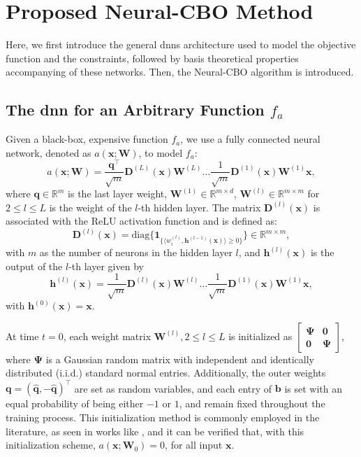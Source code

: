 \section{Proposed Neural-CBO Method}
\label{section:neural-cbo}
Here, we first introduce the general \acp{dnn} architecture used to model the objective function and the constraints, followed by basis theoretical properties accompanying of these networks. Then, the Neural-CBO algorithm is introduced. 

\subsection{The \acl{dnn} for an Arbitrary Function $f_a$}
\label{section:neural-cbo_arbitrary_nn}
Given a black-box, expensive function $f_a$, we use a fully connected neural network, denoted as $a(\mathbf{x}; \mathbf{W})$, to model $f_a$:
\begin{equation}
\label{eqn:neural-cbo_fcn}
    a(\mathbf{x}; \mathbf{W}) = \frac{\mathbf{q}^\top}{\sqrt{m}} \mathbf{D}^{(L)}(\mathbf{x}) \mathbf{W}^{(L)} \dots \frac{1}{\sqrt{m}} \mathbf{D}^{(1)}(\mathbf{x}) \mathbf{W}^{(1)} \mathbf{x}, 
\end{equation}
where $\mathbf{q} \in \mathbb{R}^m$ is the last layer weight, $\mathbf{W}^{(1)} \in \mathbb{R}^{m \times d}$, $\mathbf{W}^{(l)} \in \mathbb{R}^{m \times m}$ for $2 \leq l \leq L$ is the weight of the $l$-th hidden layer. The matrix $\mathbf{D}^{(l)}(\mathbf{x})$ is associated with the ReLU activation function and is defined as:
\begin{equation*}
    \mathbf{D}^{(l)}(\mathbf{x}) = \text{diag}\{\mathbf{1}_{ \{ \langle w_i^{(l)}, \mathbf{h}^{(l-1)}(\mathbf{x})  \rangle \ge 0 \} } \} \in \mathbb{R}^{m \times m},
\end{equation*}
with $m$ as the number of neurons in the hidden layer $l$, and $\mathbf{h}^{(l)}(\mathbf{x})$ is the output of the $l$-th layer given by 
\begin{equation*}
    \mathbf{h}^{(l)}(\mathbf{x}) = \frac{1}{\sqrt{m}} \mathbf{D}^{(l)}(\mathbf{x}) \mathbf{W}^{(l)} \dots \frac{1}{\sqrt{m}} \mathbf{D}^{(1)}(\mathbf{x}) \mathbf{W}^{(1)} \mathbf{x},
\end{equation*}
with $\mathbf{h}^{(0)}(\mathbf{x}) = \mathbf{x}$. 

At time $t=0$, each weight matrix $\mathbf{W}^{(l)},  2 \le l \le L$ is initialized as $\begin{bmatrix}
\boldsymbol{\Psi} & \mathbf{0}  \\
\mathbf{0} & \boldsymbol{\Psi}
\end{bmatrix}
$, where $\boldsymbol{\Psi}$ is a Gaussian random matrix with independent and identically distributed (i.i.d.) standard normal entries. Additionally, the outer weights $\mathbf{q} = (\hat{\mathbf{q}}, -\hat{\mathbf{q}})^\top$  are set as random variables, and each entry of $\mathbf{b}$ is set with an equal probability of being either $-1$ or $1$, and remain fixed throughout the training process. This initialization method is commonly employed in the literature, as seen in works like \citet{du2018gradient, arora2019fine}, and it
can be verified that, with this initialization scheme, $a(\mathbf{x}; \mathbf{W}_0) = 0$, for all input $\mathbf{x}$. 


